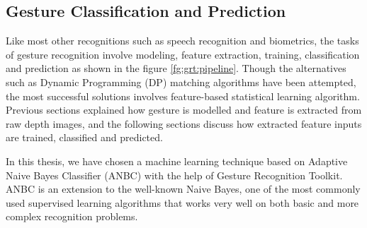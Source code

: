 

\subsection{Gesture Classification and Prediction} Like most other recognitions such as speech recognition and biometrics, the tasks of gesture recognition involve modeling, feature extraction, training, classification and prediction as shown in the figure \ref{fg:grt:pipeline}. Though the alternatives such as Dynamic Programming (DP) matching algorithms have been attempted, the most successful solutions involves feature-based statistical learning algorithm. Previous sections explained how gesture is modelled and feature is extracted from raw depth images, and the following sections discuss how extracted feature inputs are trained, classified and predicted.

In this thesis, we have chosen a machine learning technique based on Adaptive Naive Bayes Classifier (ANBC) with the help of Gesture Recognition Toolkit. ANBC is an extension to the well-known Naive Bayes, one of the most commonly used supervised learning algorithms that works very well on both basic and more complex recognition problems.

 
